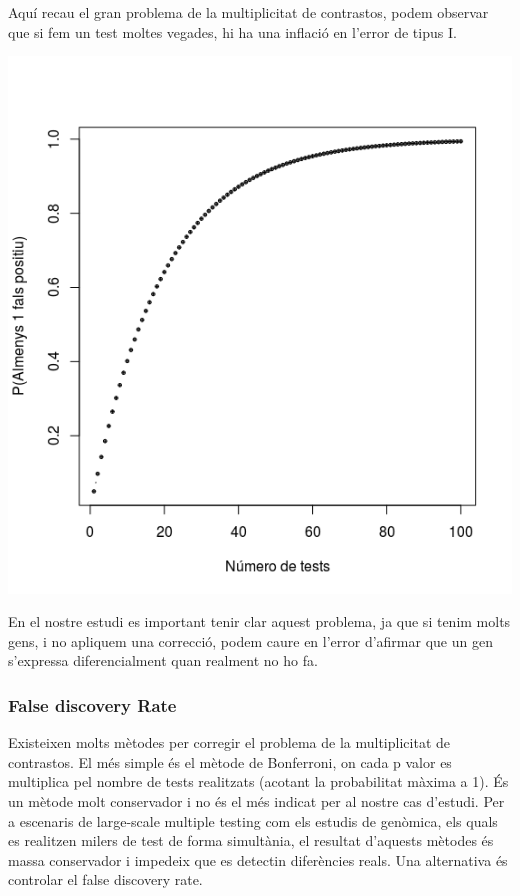 \documentclass[english]{article}
\begin{document}
Aquí recau el gran problema de la multiplicitat de contrastos, podem observar que si fem un test moltes vegades, hi ha una inflació en l'error de tipus I.
\begin{center}
\includegraphics[scale=0.5]{FalsPositiu.png}
\end{center}
En el nostre estudi es important tenir clar aquest problema, ja que si tenim molts gens, i no apliquem una correcció, podem caure en l'error d'afirmar que un gen s'expressa diferencialment quan realment no ho fa.
\subsubsection{False discovery Rate}
Existeixen molts mètodes per corregir el problema de la multiplicitat de contrastos. El més simple és el mètode de Bonferroni, on cada p valor es multiplica pel nombre de tests realitzats (acotant la probabilitat màxima a 1). És un mètode molt conservador i no és el més indicat per al nostre cas d'estudi.
Per a escenaris de large-scale multiple testing com els estudis de genòmica, els quals es realitzen milers de test de forma simultània, el resultat d'aquests mètodes és massa conservador i impedeix que es detectin diferències reals. Una alternativa és controlar el false discovery rate.
\\
\end{document}
